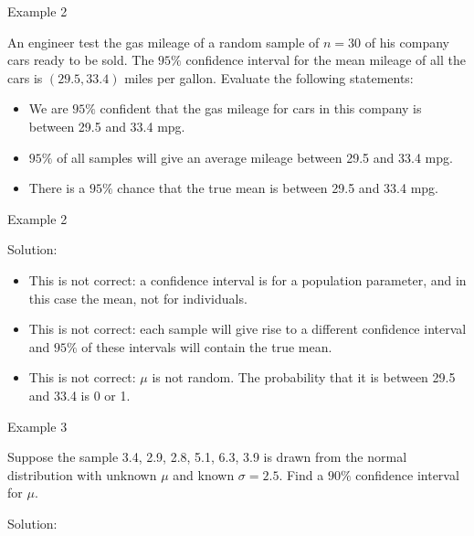 \documentclass[
  ignorenonframetext,
]{beamer}
\begin{document}
\begin{frame}{Example 2}
\label{example-2}
\begin{tcolorbox}
An engineer test the gas mileage of a random sample of $n=30$ of his company cars ready to be sold. The $95\%$ confidence interval for the mean mileage of all the cars is $(29.5, 33.4)$ miles per gallon. Evaluate the following statements:
\begin{itemize}
\item We are $95\%$ confident that the gas mileage for cars in this company is between 29.5 and 33.4 mpg.

\item $95\%$ of all samples will give an average mileage between 29.5 and 33.4 mpg.

\item There is a $95\%$ chance that the true mean is between 29.5 and 33.4 mpg.
\end{itemize}
\end{tcolorbox}
\end{frame}

\begin{frame}{Example 2}
\label{example-2-1}
\begin{tcolorbox}
Solution: 
\begin{itemize}
\item This is not correct: a confidence interval is for a population parameter, and in this case the mean, not for individuals.

\item This is not correct: each sample will give rise to a different confidence interval and $95\%$ of these intervals will contain the true mean.

\item This is not correct: $\mu$ is not random. The probability that it is between 29.5 and 33.4 is 0 or 1.
\end{itemize}
\end{tcolorbox}
\end{frame}

\begin{frame}{Example 3}
\label{example-3}
\begin{tcolorbox}
 Suppose the sample 3.4, 2.9, 2.8, 5.1, 6.3, 3.9 is drawn from the normal distribution with unknown $\mu$ and known $\sigma=2.5$. Find a $90\%$ confidence interval for $\mu$.
\end{tcolorbox}

\begin{tcolorbox}
Solution: 

\vspace{30mm}


\end{tcolorbox}
\end{frame}
\end{document}
